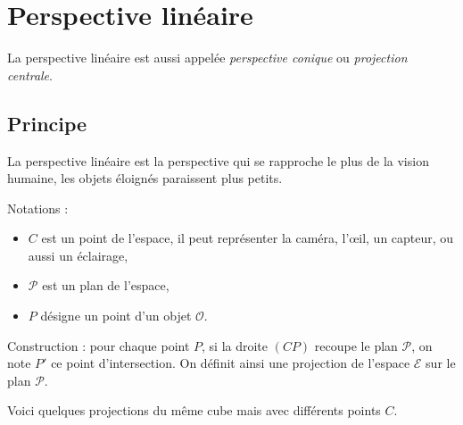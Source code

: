 \documentclass[11pt,class=report,crop=false]{standalone}
\begin{document}

%
%
%


\section{Perspective linéaire}


La perspective linéaire est aussi appelée \emph{perspective conique} ou \emph{projection centrale}.

\subsection{Principe}

La perspective linéaire est la perspective qui se rapproche le plus de la vision humaine, les objets éloignés paraissent plus petits.

Notations :
\begin{itemize}
  \item $C$ est un point de l'espace, il peut représenter la caméra, l'\oe{}il, un capteur, ou aussi un éclairage,
  \item $\mathcal{P}$ est un plan de l'espace,
  \item $P$ désigne un point d'un objet $\mathcal{O}$.
\end{itemize}

Construction : pour chaque point $P$, si la droite $(CP)$ recoupe le plan $\mathcal{P}$, on note $P'$ ce point d'intersection. On définit ainsi une projection de
l'espace $\mathcal{E}$ sur le plan $\mathcal{P}$.


Voici quelques projections du même cube mais avec différents points $C$.



\end{document}

